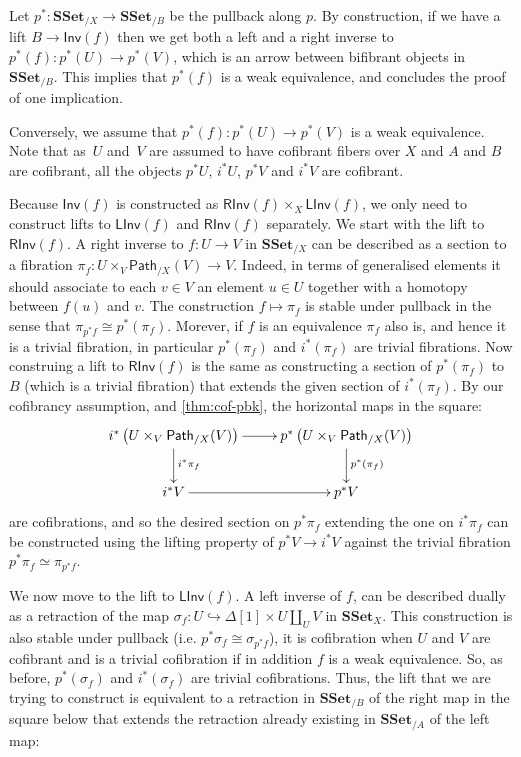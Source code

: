\documentclass[reqno,10pt,a4paper,oneside,draft]{amsart}
\makeatletter
\renewenvironment{proof}[1][\proofname] {\par\pushQED{\qed}\normalfont\topsep6\p@\@plus6\p@\relax\trivlist\item[\hskip\labelsep\bf#1\@addpunct{.}]\ignorespaces}{\popQED\endtrivlist\@endpefalse}
\numberwithin{equation}{section}
\theoremstyle{mythm}
\theoremstyle{mydef}
\theoremstyle{myrmk}
\newcommand{\co}{\colon}
\newcommand{\SSet}{\mathbf{SSet}}
\newcommand{\Iseq}{\mathsf{Inv}}
\newcommand{\Linv}{\mathsf{LInv}}
\newcommand{\Rinv}{\mathsf{RInv}}
\newcommand{\Path}{\mathsf{Path}}
\makeatother
\begin{document}
\begin{proof} Let  $p^* \co \SSet_{/X} \to \SSet_{/B}$ be the pullback along $p$.
 By construction, if we have a lift $B \to \Iseq(f)$ then we get both a left and a right inverse to $p^*(f) \co p^*(U) \to p^*(V)$, which is an arrow between bifibrant objects in $\SSet_{/B}$. This implies that $p^*(f)$ is a weak equivalence, and concludes the proof of one implication.

Conversely, we assume that $p^*(f): p^*(U) \to p^*(V)$ is a weak equivalence. Note that as~$U$ and~$V$ are assumed to have cofibrant fibers over $X$ and $A$ and $B$ are cofibrant, all the objects $p^*U$, $i^*U$, $p^*V$ and $i^* V$ are cofibrant.

Because $\Iseq(f)$ is constructed as $\Rinv(f) \times_X \Linv(f)$, we only need to construct lifts to $\Linv(f)$ and $\Rinv(f)$ separately. We start with the lift to $\Rinv(f)$. A right inverse to $f : U \to V$ in $\SSet_{/X}$ can be described as a section to a fibration $\pi_f: U \times_V \Path_{/X}(V) \to V$. Indeed, in terms of generalised elements it should associate to each $v \in V$ an element $u\in U$ together with a homotopy between $f(u)$ and $v$. The construction  $f \mapsto \pi_f$ is stable under pullback in the sense that $\pi_{p^* f} \cong p^*(\pi_f)$. Morever, if $f$ is an equivalence $\pi_f$ also is, and hence it is a trivial fibration, in particular $p^*(\pi_f)$ and $i^*(\pi_f)$ are trivial fibrations. Now construing a lift to $\Rinv(f)$ is the same as constructing a section of $p^*(\pi_f)$ to $B$ (which is a trivial fibration) that extends the given section of $i^*(\pi_f)$. By our cofibrancy assumption, and \cref{thm:cof-pbk}, the horizontal maps in the square:
\[
\xymatrix{  i^*\left( U \times_V \Path_{/X}(V) \right) \ar[r] \ar[d]^{i^* \pi_f} & p^*\left( U \times_V \Path_{/X}(V) \right)  \ar[d]^{p^*(\pi_f)} \\
i^*V \ar[r] & p^* V
}
\]
are cofibrations, and so the desired section on $p^*\pi_f$ extending the one on $i^*\pi_f$ can be constructed using the lifting property of $p^*V \to i^* V$ against the trivial fibration $p^* \pi_f \simeq \pi_{p^* f}$.

  
We now move to the lift to $\Linv(f)$. A left inverse of $f$, can be described dually as a retraction of the map $\sigma_f: U \hookrightarrow \Delta[1] \times U \coprod_U V$ in $\SSet_X$. This construction is also stable under pullback (i.e. $p^*\sigma_f \cong \sigma_{p^* f}$), it is cofibration when $U$ and $V$ are cofibrant and is a trivial cofibration if in addition $f$ is a weak equivalence. So, as before, $p^*(\sigma_f)$ and $i^*(\sigma_f)$ are trivial cofibrations. Thus, the lift that we are trying to construct is equivalent to a retraction in $\SSet_{/B}$ of the right map in the square below that extends the retraction already existing in $\SSet_{/A}$ of the left map:


\end{proof}
\end{document}
